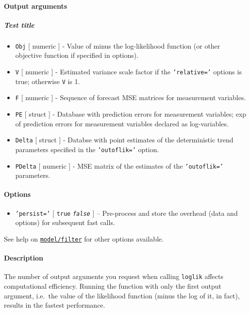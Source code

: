 \paragraph{Output arguments}\label{output-arguments}

\subparagraph{Test title}\label{test-title}

\begin{itemize}
\item
  \texttt{Obj} {[} numeric {]} - Value of minus the log-likelihood
  function (or other objective function if specified in options).
\item
  \texttt{V} {[} numeric {]} - Estimated variance scale factor if the
  \texttt{'relative='} options is true; otherwise \texttt{V} is 1.
\item
  \texttt{F} {[} numeric {]} - Sequence of forecast MSE matrices for
  measurement variables.
\item
  \texttt{PE} {[} struct {]} - Database with prediction errors for
  measurement variables; exp of prediction errors for measurement
  variables declared as log-variables.
\item
  \texttt{Delta} {[} struct {]} - Databse with point estimates of the
  deterministic trend parameters specified in the \texttt{'outoflik='}
  option.
\item
  \texttt{PDelta} {[} numeric {]} - MSE matrix of the estimates of the
  \texttt{'outoflik='} parameters.
\end{itemize}

\paragraph{Options}\label{options}

\begin{itemize}
\itemsep1pt\parskip0pt
\item
  \texttt{'persist='} {[} \texttt{true} \textbar{} \emph{\texttt{false}}
  {]} -- Pre-process and store the overhead (data and options) for
  subsequent fast calls.
\end{itemize}

See help on \href{model/filter}{\texttt{model/filter}} for other options
available.

\paragraph{Description}\label{description}

The number of output arguments you request when calling \texttt{loglik}
affects computational efficiency. Running the function with only the
first output argument, i.e.~the value of the likelihood function (minus
the log of it, in fact), results in the fastest performance.

